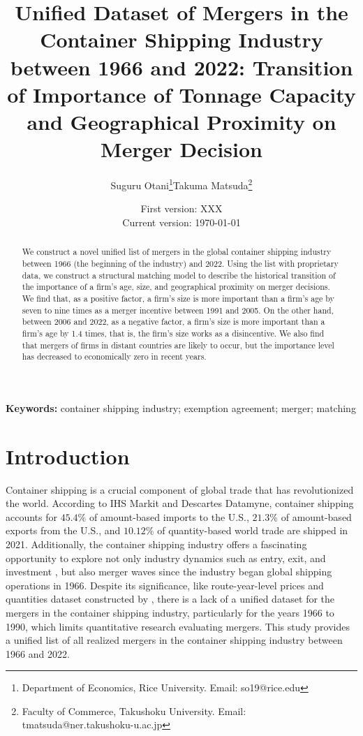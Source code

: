 \documentclass[10pt]{article}
\title{Unified Dataset of Mergers in the Container Shipping Industry between 1966 and 2022: Transition of Importance of Tonnage Capacity and Geographical Proximity on Merger Decision}
\author{Suguru Otani\thanks{Department of Economics, Rice University. Email: so19@rice.edu}\quad  Takuma Matsuda\thanks{Faculty of Commerce, Takushoku University. Email: tmatsuda@ner.takushoku-u.ac.jp}}
\date{
First version: XXX\\
Current version: \today
}
\begin{document}
\maketitle

\begin{abstract}
We construct a novel unified list of mergers in the global container shipping industry between 1966  (the beginning of the industry) and 2022. Using the list with proprietary data, we construct a structural matching model \citep{fox2018qe} to describe the historical transition of the importance of a firm's age, size, and geographical proximity on merger decisions. 
We find that, as a positive factor, a firm's size is more important than a firm's age by seven to nine times as a merger incentive between 1991 and 2005.
On the other hand, between 2006 and 2022, as a negative factor, a firm's size is more important than a firm's age by 1.4 times, that is, the firm's size works as a disincentive.
We also find that mergers of firms in distant countries are likely to occur, but the importance level has decreased to economically zero in recent years. 
\end{abstract} 

\vspace{0.1in}
\noindent\textbf{Keywords:} container shipping industry; exemption agreement;  merger; matching 
\vspace{0in}


\section{Introduction}

Container shipping is a crucial component of global trade that has revolutionized the world. 
According to IHS Markit and Descartes Datamyne, container shipping accounts for $45.4 \%$ of amount-based imports to the U.S., $21.3 \%$ of amount-based exports from the U.S., and $10.12 \%$ of quantity-based world trade are shipped in 2021. 
Additionally, the container shipping industry offers a fascinating opportunity to explore not only industry dynamics such as entry, exit, and investment \citep{otani2023industry}, but also merger waves since the industry began global shipping operations in 1966. 
Despite its significance, like route-year-level prices and quantities dataset constructed by \cite{matsuda2022unified}, there is a lack of a unified dataset for the mergers in the container shipping industry, particularly for the years 1966 to 1990, which limits quantitative research evaluating mergers. 
This study provides a unified list of all realized mergers in the container shipping industry between 1966 and 2022.
\end{document}
